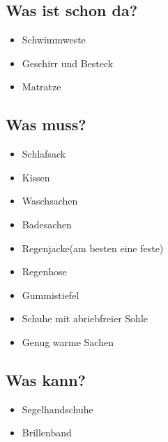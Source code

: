 \documentclass[12pt]{article}
\begin{document}
\subsection*{Was ist schon da?}
\begin{itemize}
\renewcommand{\labelitemi}{$\boxempty$}
\item Schwimmweste
\item Geschirr und Besteck
\item Matratze
\end{itemize}

\subsection*{Was muss?}
\begin{itemize}
\renewcommand{\labelitemi}{$\boxempty$}
\item Schlafsack
\item Kissen
\item Waschsachen
\item Badesachen
\item Regenjacke(am besten eine feste)
\item Regenhose
\item Gummistiefel
\item Schuhe mit abriebfreier Sohle
\item Genug warme Sachen
\end{itemize}

\subsection*{Was kann?}
\begin{itemize}
\renewcommand{\labelitemi}{$\boxempty$}
\item Segelhandschuhe
\item Brillenband
\end{itemize}
\end{document}
